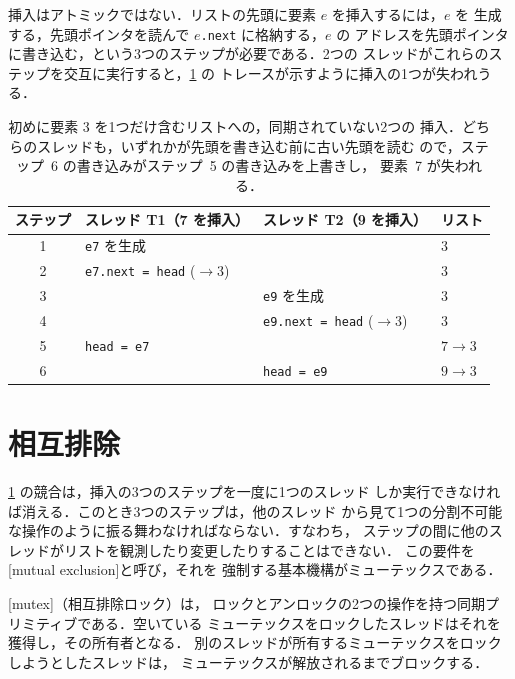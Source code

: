 \documentclass[../main.tex]{subfiles}
\begin{document}
挿入はアトミックではない．リストの先頭に要素 $e$ を挿入するには，$e$ を
生成する，先頭ポインタを読んで $e$\texttt{.next} に格納する，$e$ の
アドレスを先頭ポインタに書き込む，という3つのステップが必要である．2つの
スレッドがこれらのステップを交互に実行すると，\cref{tab:l03-race} の
トレースが示すように挿入の1つが失われうる．

\begin{table}[htbp]
  \centering
  \caption{初めに要素 3 を1つだけ含むリストへの，同期されていない2つの
    挿入．どちらのスレッドも，いずれかが先頭を書き込む前に古い先頭を読む
    ので，ステップ~6 の書き込みがステップ~5 の書き込みを上書きし，
    要素~7 が失われる．}
  \label{tab:l03-race}
  \small
  \begin{tabular}{@{}clll@{}}
    \toprule
    ステップ & スレッド T1（7 を挿入） & スレッド T2（9 を挿入） & リスト \\
    \midrule
    1 & \texttt{e7} を生成            &                           & $3$ \\
    2 & \texttt{e7.next = head} ($\to 3$) &                      & $3$ \\
    3 &                              & \texttt{e9} を生成        & $3$ \\
    4 &                              & \texttt{e9.next = head} ($\to 3$) & $3$ \\
    5 & \texttt{head = e7}           &                           & $7\to 3$ \\
    6 &                              & \texttt{head = e9}        & $9\to 3$ \\
    \bottomrule
  \end{tabular}
\end{table}

\section{相互排除}
\label{sec:l03-mutex}

\cref{tab:l03-race} の競合は，挿入の3つのステップを一度に1つのスレッド
しか実行できなければ消える．このとき3つのステップは，他のスレッド
から見て1つの分割不可能な操作のように振る舞わなければならない．すなわち，
ステップの間に他のスレッドがリストを観測したり変更したりすることはできない．
この要件を[mutual exclusion]と呼び，それを
強制する基本機構がミューテックスである．

\begin{definition}[ミューテックス]
  [mutex]（相互排除ロック）は，
  ロックとアンロックの2つの操作を持つ同期プリミティブである．空いている
  ミューテックスをロックしたスレッドはそれを獲得し，その所有者となる．
  別のスレッドが所有するミューテックスをロックしようとしたスレッドは，
  ミューテックスが解放されるまでブロックする．
\end{definition}
\end{document}
